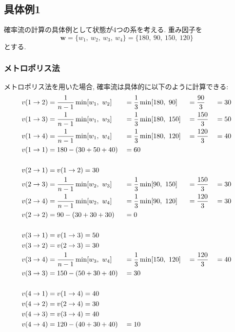 \clearpage
\subsection{具体例1}
確率流の計算の具体例として状態が4つの系を考える. 
重み因子を
\begin{equation}
    \bm{w} = \{w_{1},~w_{2},~w_{3},~w_{4}\} = \{180,~ 90,~ 150,~ 120\}
\end{equation}
とする. 

\subsubsection{メトロポリス法}
メトロポリス法を用いた場合, 確率流は具体的に以下のように計算できる:
\begin{alignat}{4}
    v(1 \to 2) &= \frac{1}{n-1} \min[w_{1},~ w_{2}] &&= \frac{1}{3} \min[180,~  90] &&= \frac{90}{3}  &&= 30 \notag \\
    v(1 \to 3) &= \frac{1}{n-1} \min[w_{1},~ w_{3}] &&= \frac{1}{3} \min[180,~ 150] &&= \frac{150}{3} &&= 50 \notag \\
    v(1 \to 4) &= \frac{1}{n-1} \min[w_{1},~ w_{4}] &&= \frac{1}{3} \min[180,~ 120] &&= \frac{120}{3} &&= 40 \notag \\
    v(1 \to 1) &= 180 - (30 + 50 + 40) &&= 60 \notag \\
    \notag \\
    v(2 \to 1) &= v(1 \to 2) = 30 \notag \\
    v(2 \to 3) &= \frac{1}{n-1} \min[w_{2},~ w_{3}] &&= \frac{1}{3} \min[90,~ 150] &&= \frac{150}{3} &&= 30 \notag \\
    v(2 \to 4) &= \frac{1}{n-1} \min[w_{2},~ w_{4}] &&= \frac{1}{3} \min[90,~ 120] &&= \frac{120}{3} &&= 30 \notag \\
    v(2 \to 2) &= 90 - (30 + 30 + 30) &&= 0 \notag \\
    \notag \\
    v(3 \to 1) &= v(1 \to 3) = 50 \notag \\
    v(3 \to 2) &= v(2 \to 3) = 30 \notag \\
    v(3 \to 4) &= \frac{1}{n-1} \min[w_{3},~ w_{4}] &&= \frac{1}{3} \min[150,~ 120] &&= \frac{120}{3} &&= 40 \notag \\
    v(3 \to 3) &= 150 - (50 + 30 + 40) &&= 30 \notag \\
    \notag \\
    v(4 \to 1) &= v(1 \to 4) = 40 \notag \\
    v(4 \to 2) &= v(2 \to 4) = 30 \notag \\
    v(4 \to 3) &= v(3 \to 4) = 40 \notag \\
    v(4 \to 4) &= 120 - (40 + 30 + 40) &&= 10 \notag
\end{alignat}

